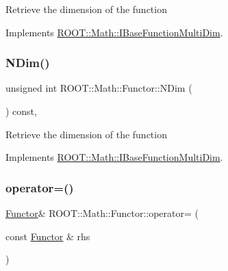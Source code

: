 Retrieve the dimension of the function 

Implements \mbox{\hyperlink{classROOT_1_1Math_1_1IBaseFunctionMultiDim_a16f37dc7a6d00c75ddeda0697741315d}{R\+O\+O\+T\+::\+Math\+::\+I\+Base\+Function\+Multi\+Dim}}.

\mbox{\label{classROOT_1_1Math_1_1Functor_a2544e2ed3c6a0420084c7b08eb3c3130}} 
\subsubsection{\texorpdfstring{NDim()}{NDim()}\hspace{0.1cm}{\footnotesize\ttfamily [3/3]}}
{\footnotesize\ttfamily unsigned int R\+O\+O\+T\+::\+Math\+::\+Functor\+::\+N\+Dim (\begin{DoxyParamCaption}{ }\end{DoxyParamCaption}) const\hspace{0.3cm}{\ttfamily [inline]}, {\ttfamily [virtual]}}

Retrieve the dimension of the function 

Implements \mbox{\hyperlink{classROOT_1_1Math_1_1IBaseFunctionMultiDim_a16f37dc7a6d00c75ddeda0697741315d}{R\+O\+O\+T\+::\+Math\+::\+I\+Base\+Function\+Multi\+Dim}}.

\mbox{\label{classROOT_1_1Math_1_1Functor_a24bd9cdf7e31e443bff64c5fb4378c99}} 
\subsubsection{\texorpdfstring{operator=()}{operator=()}\hspace{0.1cm}{\footnotesize\ttfamily [1/3]}}
{\footnotesize\ttfamily \mbox{\hyperlink{classROOT_1_1Math_1_1Functor}{Functor}}\& R\+O\+O\+T\+::\+Math\+::\+Functor\+::operator= (\begin{DoxyParamCaption}\item[{const \mbox{\hyperlink{classROOT_1_1Math_1_1Functor}{Functor}} \&}]{rhs }\end{DoxyParamCaption})\hspace{0.3cm}{\ttfamily [inline]}}

